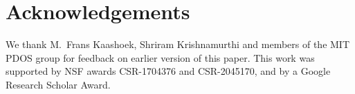 \section*{Acknowledgements}

We thank M.\ Frans Kaashoek, Shriram Krishnamurthi and
members of the MIT PDOS group for feedback on earlier
version of this paper.
%
This work was supported by NSF awards CSR-1704376 and
CSR-2045170, and by a Google Research Scholar Award.
%
